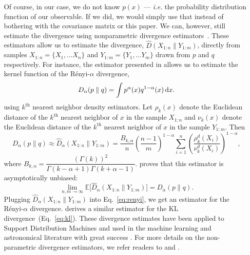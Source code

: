\documentclass[12pt, letterpaper, preprint]{aastex}
\newcommand{\beq}{\begin{equation}}
\newcommand{\eeq}{\end{equation}}
\begin{document}
Of course, in our case, we do not know $p(x)$ --- \emph{i.e.} the probability 
distribution function of our observable. If we did, we would simply use that 
instead of bothering with the covariance matrix or this paper. We can, however, 
still estimate the divergence using nonparametric divergence estimators~\citep{wang2009, poczos2012, krishnamurthy2014}. 
These estimators allow us to estimate the divergence, $\widehat{D}(X_{1:n} \parallel Y_{1:m})$, directly from 
samples $X_{1:n} = \{ X_1, ... X_n \}$ and $Y_{1:m} = \{ Y_1, ... Y_m \}$ 
drawn from $p$ and $q$ respectively.
For instance, the estimator presented in \cite{poczos2012} allows us to estimate 
the kernel function of the R\'enyi-$\alpha$ divergence,
\beq \label{eq:d_alpha}
D_{\alpha} ( p \parallel q ) = \int p^\alpha(x) q^{1-\alpha}(x)\,{\rm d}x. 
\eeq
using $k^\mathrm{th}$ nearest neighbor density estimators. Let $\rho_k(x)$ 
denote the Euclidean distance of the $k^\mathrm{th}$ nearest neighbor 
of $x$ in the sample $X_{1:n}$ and $\nu_k(x)$ denote the Euclidean distance 
of the $k^\mathrm{th}$ nearest neighbor of $x$ in the sample $Y_{1:m}$. Then 
\beq \label{eq:d_alpha_est}
D_{\alpha}(p \parallel q) \approx \widehat{D}_{\alpha}(X_{1:n} \parallel Y_{1:m}) = \frac{B_{k,\alpha}}{n} \left(\frac{n-1}{m}\right)^{1-\alpha}
\sum\limits_{i=1}^{n} \left(\frac{\rho_k^{d}(X_i)}{\nu_k^{d}(X_i)} \right)^{1-\alpha},
\eeq
where $B_{k, \alpha} = \dfrac{(\Gamma(k))^2}{\Gamma(k-\alpha+1)\Gamma(k+\alpha-1)}$. 
\cite{poczos2012} proves that this estimator is asymptotically unbiased: 
\beq
\lim_{n, m \rightarrow \infty} \mathbb{E} \big[ \widehat{D}_{\alpha} (X_{1:n} \parallel Y_{1:m}) \big] = D_{\alpha} (p \parallel q).
\eeq
Plugging $\widehat{D}_{\alpha}(X_{1:n} \parallel Y_{1:m})$ into Eq.~\ref{eq:renyi},
we get an estimator for the R\'enyi-$\alpha$ divergence. \cite{wang2009} derives
a similar estimator for the KL divergence~(Eq.~\ref{eq:kl}). 
These divergence estimates have been applied to Support Distribution Machines 
and used in the machine learning and astronomical literature with great success
\citep[\emph{e.g.}][]{poczos2011, poczos2012, poczos2012a, xu2013, ntampaka2015, ntampaka2016, ravanbakhsh2017a}. %
For more details on the non-parametric divergence estimators, we refer readers to 
\cite{poczos2012} and \cite{krishnamurthy2014}.
\end{document}
